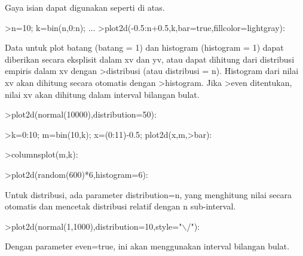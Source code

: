\documentclass[12pt,arial,letterpaper]{book}
\begin{document}
\begin{eulercomment}
\begin{eulercomment}
\begin{eulercomment}
\begin{eulercomment}
\begin{eulercomment}
\begin{eulercomment}
\begin{eulercomment}
\begin{eulercomment}
\begin{eulercomment}
\begin{eulercomment}
\begin{eulercomment}
\begin{eulercomment}
\begin{eulercomment}
\begin{eulercomment}
\begin{eulercomment}
\begin{eulercomment}
\begin{eulercomment}
Gaya isian dapat digunakan seperti di atas.
\end{eulercomment}
\begin{eulerprompt}
>n=10; k=bin(n,0:n); ...
>plot2d(-0.5:n+0.5,k,bar=true,fillcolor=lightgray):
\end{eulerprompt}
\begin{eulercomment}
Data untuk plot batang (batang = 1) dan histogram (histogram = 1)
dapat diberikan secara eksplisit dalam xv dan yv, atau dapat dihitung
dari distribusi empiris dalam xv dengan \textgreater{}distribusi (atau distribusi =
n). Histogram dari nilai xv akan dihitung secara otomatis dengan
\textgreater{}histogram. Jika \textgreater{}even ditentukan, nilai xv akan dihitung dalam
interval bilangan bulat.
\end{eulercomment}
\begin{eulerprompt}
>plot2d(normal(10000),distribution=50):
\end{eulerprompt}
\begin{eulerprompt}
>k=0:10; m=bin(10,k); x=(0:11)-0.5; plot2d(x,m,>bar):
\end{eulerprompt}
\begin{eulerprompt}
>columnsplot(m,k):
\end{eulerprompt}
\begin{eulerprompt}
>plot2d(random(600)*6,histogram=6):
\end{eulerprompt}
\begin{eulercomment}
Untuk distribusi, ada parameter distribution=n, yang menghitung nilai
secara otomatis dan mencetak distribusi relatif dengan n sub-interval.
\end{eulercomment}
\begin{eulerprompt}
>plot2d(normal(1,1000),distribution=10,style="\(\backslash\)/"):
\end{eulerprompt}
\begin{eulercomment}
Dengan parameter even=true, ini akan menggunakan interval bilangan
bulat.
\end{eulercomment}
\begin{eulerprompt}

\end{eulerprompt}
\end{eulercomment}
\end{eulercomment}
\end{eulercomment}
\end{eulercomment}
\end{eulercomment}
\end{eulercomment}
\end{eulercomment}
\end{eulercomment}
\end{eulercomment}
\end{eulercomment}
\end{eulercomment}
\end{eulercomment}
\end{eulercomment}
\end{eulercomment}
\end{eulercomment}
\end{eulercomment}
\end{document}
